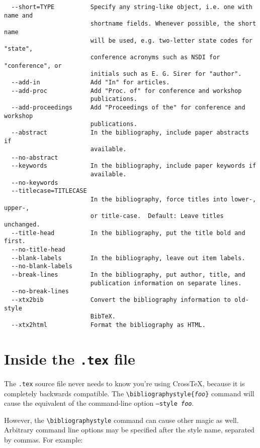 \documentclass{article}
\newcommand{\XTeX}{Cross\TeX}
\begin{document}
\begin{small}
\begin{verbatim}
  --short=TYPE          Specify any string-like object, i.e. one with name and
                        shortname fields. Whenever possible, the short name
                        will be used, e.g. two-letter state codes for "state",
                        conference acronyms such as NSDI for "conference", or
                        initials such as E. G. Sirer for "author".
  --add-in              Add "In" for articles.
  --add-proc            Add "Proc. of" for conference and workshop
                        publications.
  --add-proceedings     Add "Proceedings of the" for conference and workshop
                        publications.
  --abstract            In the bibliography, include paper abstracts if
                        available.
  --no-abstract         
  --keywords            In the bibliography, include paper keywords if
                        available.
  --no-keywords         
  --titlecase=TITLECASE
                        In the bibliography, force titles into lower-, upper-,
                        or title-case.  Default: Leave titles unchanged.
  --title-head          In the bibliography, put the title bold and first.
  --no-title-head       
  --blank-labels        In the bibliography, leave out item labels.
  --no-blank-labels     
  --break-lines         In the bibliography, put author, title, and
                        publication information on separate lines.
  --no-break-lines      
  --xtx2bib             Convert the bibliography information to old-style
                        BibTeX.
  --xtx2html            Format the bibliography as HTML.
\end{verbatim}\end{small}



\section{Inside the \texttt{.tex} file}

The \texttt{.tex} source file never needs to know you're using \XTeX{}, because it is completely backwards compatible. The \texttt{\textbackslash{}bibliographystyle\{\textrm{\textit{foo}}\}} command will cause the equivalent of the command-line option \texttt{--style \textrm{\textit{foo}}}.

However, the \texttt{\textbackslash{}bibliographystyle} command can cause other magic as well. Arbitrary command line options may be specified after the style name, separated by commas. For example:
\end{document}
